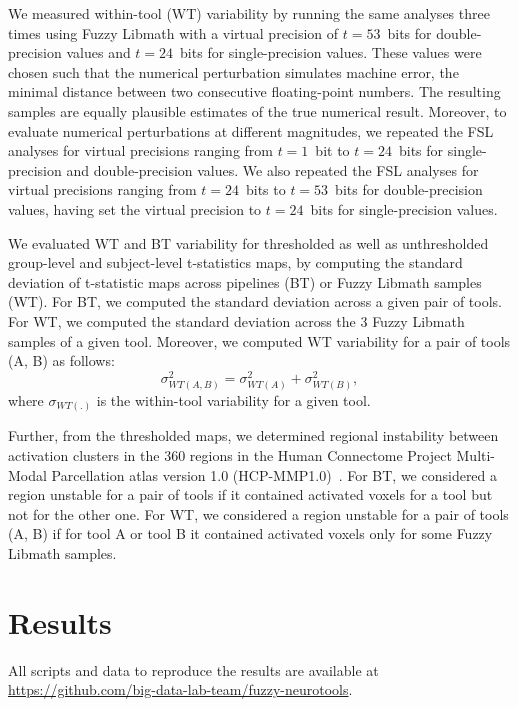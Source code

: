 \documentclass[conference]{IEEEtran}
\begin{document}
We measured within-tool (WT) variability by running the same analyses three
times using Fuzzy Libmath with a virtual precision of $t=53$~bits for
double-precision values and $t=24$~bits for single-precision values. These
values were chosen such that the numerical perturbation simulates machine
error, the minimal distance between two consecutive floating-point numbers. The resulting samples are equally plausible estimates of
the true numerical result. Moreover, to evaluate numerical perturbations at different magnitudes, 
we repeated the FSL analyses for virtual
precisions ranging from $t=1$~bit to $t=24$~bits for single-precision
and double-precision values. We also repeated the FSL analyses for virtual 
precisions ranging from $t=24$~bits to $t=53$~bits for double-precision values, having 
set the virtual precision to $t=24$~bits for single-precision values. 

We evaluated WT and BT variability for thresholded as well as unthresholded
group-level and subject-level t-statistics maps, by computing the
standard deviation of t-statistic maps across pipelines (BT) or Fuzzy Libmath samples (WT). For BT, we computed the standard deviation 
across a given pair of tools.
For WT, we computed the standard deviation across the 3 
Fuzzy Libmath samples of a given tool. Moreover, we computed WT variability for a pair of tools (A, B) as follows:
\begin{equation}
  \sigma_{WT(A,B)}^2 = \sigma_{WT(A)}^2 + \sigma_{WT(B)}^2,
  \label{eq:wt-pair}
\end{equation}
where $\sigma_{WT(.)}$ is the within-tool variability for a given tool.

Further, from the thresholded maps, we determined regional instability
between activation clusters in the 360 regions in the Human Connectome
Project Multi-Modal Parcellation atlas version 1.0
(HCP-MMP1.0)~\cite{glasser2016multi}. For BT, we considered a region
unstable for a pair of tools if it contained activated voxels for a tool
but not for the other one. For WT, we considered a region unstable for a
pair of tools (A, B) if for tool A or tool B it contained activated voxels only for some Fuzzy Libmath
samples.

\section{Results}
All scripts and data to reproduce the results are
available at \url{https://github.com/big-data-lab-team/fuzzy-neurotools}.
\end{document}
